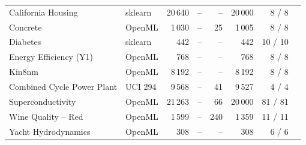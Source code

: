 \begin{table}[!htbp]
\begin{tabular}{llrrrrrl}
California Housing & sklearn & 20\,640 & -- & -- & 20\,000 & 8 / 8 & \\
Concrete & OpenML & 1\,030 & -- & 25 & 1\,005 & 8 / 8 & \\
Diabetes & sklearn & 442 & -- & -- & 442 & 10 / 10 & \\
Energy Efficiency (Y1) & OpenML & 768 & -- & -- & 768 & 8 / 8 & \\
Kin8nm & OpenML & 8\,192 & -- & -- & 8\,192 & 8 / 8 & \\
Combined Cycle Power Plant & UCI 294 & 9\,568 & -- & 41 & 9\,527 & 4 / 4 & \\
Superconductivity & OpenML & 21\,263 & -- & 66 & 20\,000 & 81 / 81 & \\
Wine Quality -- Red & OpenML & 1\,599 & -- & 240 & 1\,359 & 11 / 11 & \\
Yacht Hydrodynamics & OpenML & 308 & -- & -- & 308 & 6 / 6 & \\
\bottomrule
\end{tabular}
\end{table}
